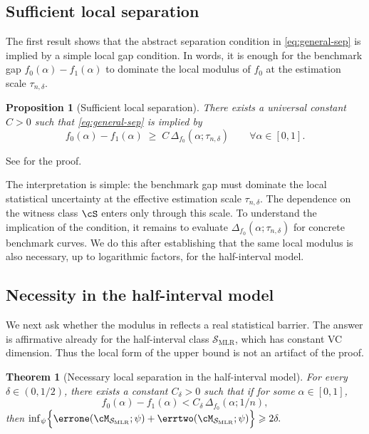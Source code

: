 \documentclass[english]{article}
\theoremstyle{plain}
\newtheorem{theorem}{Theorem}[section]
\newtheorem{proposition}{Proposition}[section]
\theoremstyle{definition}
\newcommand{\errsum}[1]{\errone(\cM_{\smlr};#1)+\errtwo(\cM_{\smlr};#1)}
\newcommand{\fnull}{f_0}
\newcommand{\falt}{f_1}
\newcommand{\smlr}{\mathcal{S}_{\mathrm{MLR}}}     %
\begin{document}
\subsection{Sufficient local separation}

The first result shows that the abstract separation condition in
\eqref{eq:general-sep} is implied by a simple local gap condition. In words, it
is enough for the benchmark gap \(\fnull(\alpha)-\falt(\alpha)\) to dominate the
local modulus of \(\fnull\) at the estimation scale \(\tau_{n,\delta}\).

\begin{proposition}[Sufficient local separation]
\label{prop:upper-rate}
There exists a universal constant \(C>0\) such that
\eqref{eq:general-sep} is implied by
\begin{equation}
\fnull(\alpha)-\falt(\alpha)
\;\geqslant\;
C\,\Delta_{\fnull}(\alpha;\tau_{n,\delta})
\qquad\forall \alpha\in[0,1].
\label{eq:upper-rate-clean}
\end{equation}
\end{proposition}

\noindent See  for the proof.
\medskip

The interpretation is simple: the benchmark gap must dominate the local
statistical uncertainty at the effective estimation scale
\(\tau_{n,\delta}\). The dependence on the witness class \(\cS\) enters only
through this scale. To understand the implication of the condition, it remains
to evaluate \(\Delta_{\fnull}(\alpha;\tau_{n,\delta})\) for concrete benchmark
curves. We do this after establishing that the same local modulus is also
necessary, up to logarithmic factors, for the half-interval model.



\subsection{Necessity in the half-interval model}

We next ask whether the modulus in  reflects
a real statistical barrier. 
The answer is affirmative already for the half-interval class
\(\mathcal S_{\mathrm{MLR}}\), which has constant VC dimension.
Thus the local form of the upper bound is not an
artifact of the proof.

\begin{theorem}[Necessary local separation in the half-interval model]
\label{thm:new-lower-bound}
For every \(\delta\in(0,1/2)\), there exists a constant \(C_\delta>0\) such
that if for some \(\alpha\in[0,1]\),
\begin{equation}
\fnull(\alpha)-\falt(\alpha)
<
C_\delta\,\Delta_{\fnull}(\alpha;1/n),
\label{eq:lower-rate-clean}
\end{equation}
then
$
\inf_{\psi}
\Bigl\{
\errsum{\psi}
\Bigr\}
\geqslant 2\delta.
$
\end{theorem}
\end{document}
